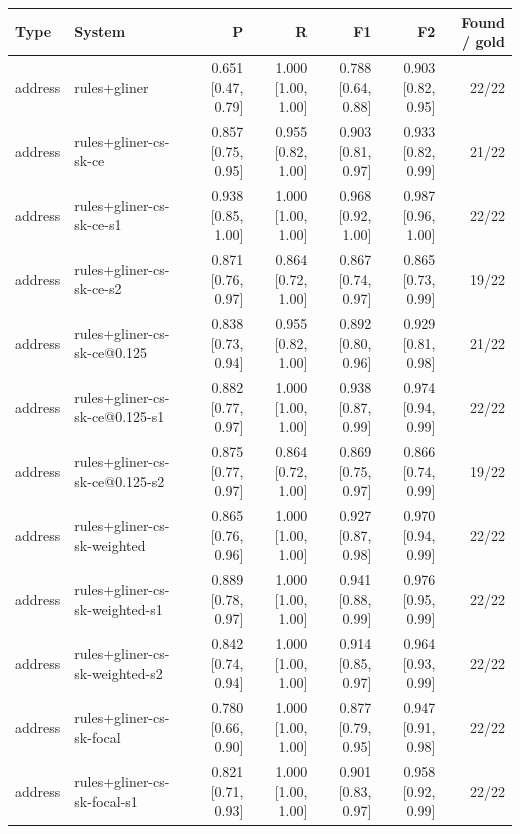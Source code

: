 \providecommand{\ci}[2]{{\scriptsize [#1, #2]}}

\begin{table}[htbp]
\centering
\small
\begin{tabular}{llrrrrr}
\toprule
Type & System & P & R & F1 & F2 & Found / gold \\
\midrule
address & rules+gliner & 0.651 \ci{0.47}{0.79} & 1.000 \ci{1.00}{1.00} & 0.788 \ci{0.64}{0.88} & 0.903 \ci{0.82}{0.95} & 22/22 \\
address & rules+gliner-cs-sk-ce & 0.857 \ci{0.75}{0.95} & 0.955 \ci{0.82}{1.00} & 0.903 \ci{0.81}{0.97} & 0.933 \ci{0.82}{0.99} & 21/22 \\
address & rules+gliner-cs-sk-ce-s1 & 0.938 \ci{0.85}{1.00} & 1.000 \ci{1.00}{1.00} & 0.968 \ci{0.92}{1.00} & 0.987 \ci{0.96}{1.00} & 22/22 \\
address & rules+gliner-cs-sk-ce-s2 & 0.871 \ci{0.76}{0.97} & 0.864 \ci{0.72}{1.00} & 0.867 \ci{0.74}{0.97} & 0.865 \ci{0.73}{0.99} & 19/22 \\
address & rules+gliner-cs-sk-ce@0.125 & 0.838 \ci{0.73}{0.94} & 0.955 \ci{0.82}{1.00} & 0.892 \ci{0.80}{0.96} & 0.929 \ci{0.81}{0.98} & 21/22 \\
address & rules+gliner-cs-sk-ce@0.125-s1 & 0.882 \ci{0.77}{0.97} & 1.000 \ci{1.00}{1.00} & 0.938 \ci{0.87}{0.99} & 0.974 \ci{0.94}{0.99} & 22/22 \\
address & rules+gliner-cs-sk-ce@0.125-s2 & 0.875 \ci{0.77}{0.97} & 0.864 \ci{0.72}{1.00} & 0.869 \ci{0.75}{0.97} & 0.866 \ci{0.74}{0.99} & 19/22 \\
address & rules+gliner-cs-sk-weighted & 0.865 \ci{0.76}{0.96} & 1.000 \ci{1.00}{1.00} & 0.927 \ci{0.87}{0.98} & 0.970 \ci{0.94}{0.99} & 22/22 \\
address & rules+gliner-cs-sk-weighted-s1 & 0.889 \ci{0.78}{0.97} & 1.000 \ci{1.00}{1.00} & 0.941 \ci{0.88}{0.99} & 0.976 \ci{0.95}{0.99} & 22/22 \\
address & rules+gliner-cs-sk-weighted-s2 & 0.842 \ci{0.74}{0.94} & 1.000 \ci{1.00}{1.00} & 0.914 \ci{0.85}{0.97} & 0.964 \ci{0.93}{0.99} & 22/22 \\
address & rules+gliner-cs-sk-focal & 0.780 \ci{0.66}{0.90} & 1.000 \ci{1.00}{1.00} & 0.877 \ci{0.79}{0.95} & 0.947 \ci{0.91}{0.98} & 22/22 \\
address & rules+gliner-cs-sk-focal-s1 & 0.821 \ci{0.71}{0.93} & 1.000 \ci{1.00}{1.00} & 0.901 \ci{0.83}{0.97} & 0.958 \ci{0.92}{0.99} & 22/22 \\

\end{tabular}
\end{table}
